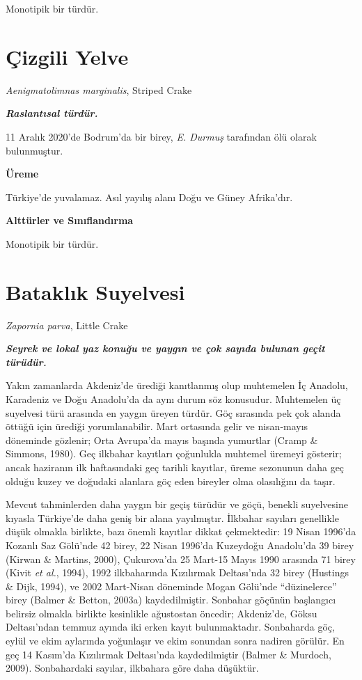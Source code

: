 \documentclass[
  a4paper,
  DIV=11,
  numbers=noendperiod]{scrreprt}
\begin{document}
Monotipik bir türdür.

\section{Çizgili Yelve}\label{uxe7izgili-yelve}

\emph{Aenigmatolimnas marginalis}, Striped Crake

\textbf{\emph{Raslantısal türdür.}}

11 Aralık 2020'de Bodrum'da bir birey, \emph{E. Durmuş} tarafından ölü
olarak bulunmuştur.

\textbf{Üreme}

Türkiye'de yuvalamaz. Asıl yayılış alanı Doğu ve Güney Afrika'dır.

\textbf{Alttürler ve Sınıflandırma}

Monotipik bir türdür.

\section{Bataklık Suyelvesi}\label{bataklux131k-suyelvesi}

\emph{Zapornia parva}, Little Crake

\textbf{\emph{Seyrek ve lokal yaz konuğu ve yaygın ve çok sayıda bulunan
geçit türüdür.}}

Yakın zamanlarda Akdeniz'de ürediği kanıtlanmış olup muhtemelen İç
Anadolu, Karadeniz ve Doğu Anadolu'da da aynı durum söz konusudur.
Muhtemelen üç suyelvesi türü arasında en yaygın üreyen türdür. Göç
sırasında pek çok alanda öttüğü için ürediği yorumlanabilir. Mart
ortasında gelir ve nisan-mayıs döneminde gözlenir; Orta Avrupa'da mayıs
başında yumurtlar (Cramp \& Simmons, 1980). Geç ilkbahar kayıtları
çoğunlukla muhtemel üremeyi gösterir; ancak haziranın ilk haftasındaki
geç tarihli kayıtlar, üreme sezonunun daha geç olduğu kuzey ve doğudaki
alanlara göç eden bireyler olma olasılığını da taşır.

Mevcut tahminlerden daha yaygın bir geçiş türüdür ve göçü, benekli
suyelvesine kıyasla Türkiye'de daha geniş bir alana yayılmıştır.
İlkbahar sayıları genellikle düşük olmakla birlikte, bazı önemli
kayıtlar dikkat çekmektedir: 19 Nisan 1996'da Kozanlı Saz Gölü'nde 42
birey, 22 Nisan 1996'da Kuzeydoğu Anadolu'da 39 birey (Kirwan \&
Martins, 2000), Çukurova'da 25 Mart-15 Mayıs 1990 arasında 71 birey
(Kivit \emph{et al.}, 1994), 1992 ilkbaharında Kızılırmak Deltası'nda 32
birey (Hustings \& Dijk, 1994), ve 2002 Mart-Nisan döneminde Mogan
Gölü'nde ``düzinelerce'' birey (Balmer \& Betton, 2003a) kaydedilmiştir.
Sonbahar göçünün başlangıcı belirsiz olmakla birlikte kesinlikle
ağustostan öncedir; Akdeniz'de, Göksu Deltası'ndan temmuz ayında iki
erken kayıt bulunmaktadır. Sonbaharda göç, eylül ve ekim aylarında
yoğunlaşır ve ekim sonundan sonra nadiren görülür. En geç 14 Kasım'da
Kızılırmak Deltası'nda kaydedilmiştir (Balmer \& Murdoch, 2009).
Sonbahardaki sayılar, ilkbahara göre daha düşüktür.
\end{document}
